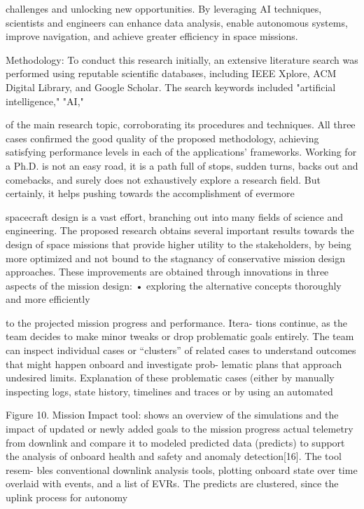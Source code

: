 \documentclass[a4paper,12pt]{article}
\begin{document}
challenges and unlocking new opportunities. By 
leveraging AI techniques, scientists and engineers 
can enhance data analysis, enable autonomous 
systems, improve navigation, and achieve greater 
efficiency in space missions. 
 
Methodology: 
To conduct this research initially, an extensive 
literature search was performed using reputable 
scientific databases, including IEEE Xplore, ACM 
Digital Library, and Google Scholar. The search 
keywords included "artificial intelligence," "AI,"

of the main research topic, corroborating its procedures and techniques. All
three cases confirmed the good quality of the proposed methodology, achieving
satisfying performance levels in each of the applications’ frameworks.
Working for a Ph.D. is not an easy road, it is a path full of stops, sudden turns,
backs out and comebacks, and surely does not exhaustively explore a research
field. But certainly, it helps pushing towards the accomplishment of evermore

spacecraft design is a vast effort, branching out into many fields of science and 
engineering. The proposed research obtains several important results towards the 
design of space missions that provide higher utility to the stakeholders, by being 
more optimized and not bound to the stagnancy of conservative mission design 
approaches. These improvements are obtained through innovations in three aspects 
of the mission design: 
• exploring the alternative concepts thoroughly and more efficiently

to the projected mission progress and performance. Itera-
tions continue, as the team decides to make minor tweaks
or drop problematic goals entirely.
The team can inspect
individual cases or “clusters” of related cases to understand
outcomes that might happen onboard and investigate prob-
lematic plans that approach undesired limits. Explanation of
these problematic cases (either by manually inspecting logs,
state history, timelines and traces or by using an automated

Figure 10. Mission Impact tool: shows an overview of the
simulations and the impact of updated or newly added goals
to the mission progress
actual telemetry from downlink and compare it to modeled
predicted data (predicts) to support the analysis of onboard
health and safety and anomaly detection[16]. The tool resem-
bles conventional downlink analysis tools, plotting onboard
state over time overlaid with events, and a list of EVRs. The
predicts are clustered, since the uplink process for autonomy
\end{document}
